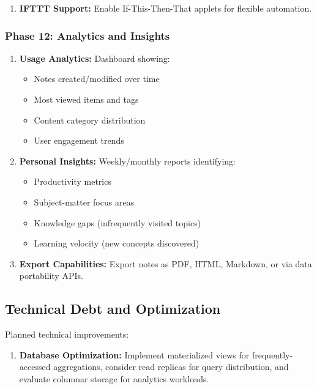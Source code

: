 \documentclass[10pt,twocolumn,a4paper]{article}
\begin{document}
\begin{table}[h]
\begin{enumerate}
\item \textbf{IFTTT Support:} Enable If-This-Then-That applets for flexible automation.

\end{enumerate}

\subsubsection{Phase 12: Analytics and Insights}

\begin{enumerate}

\item \textbf{Usage Analytics:} Dashboard showing:
  \begin{itemize}
    \item Notes created/modified over time
    \item Most viewed items and tags
    \item Content category distribution
    \item User engagement trends
  \end{itemize}

\item \textbf{Personal Insights:} Weekly/monthly reports identifying:
  \begin{itemize}
    \item Productivity metrics
    \item Subject-matter focus areas
    \item Knowledge gaps (infrequently visited topics)
    \item Learning velocity (new concepts discovered)
  \end{itemize}

\item \textbf{Export Capabilities:} Export notes as PDF, HTML, Markdown, or via data portability
  APIs.

\end{enumerate}

\subsection{Technical Debt and Optimization}

Planned technical improvements:

\begin{enumerate}

\item \textbf{Database Optimization:} Implement materialized views for frequently-accessed
  aggregations, consider read replicas for query distribution, and evaluate columnar storage
  for analytics workloads.


\end{enumerate}
\end{table}
\end{document}
